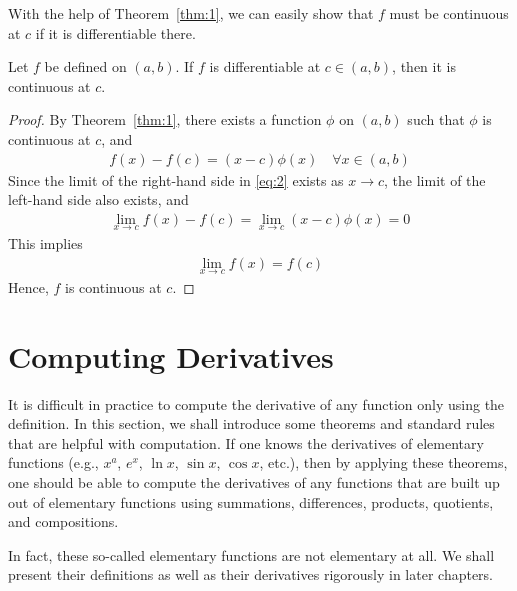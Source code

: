 \documentclass[thmcnt=section, 12pt]{my-elegantbook}
\begin{document}

With the help of Theorem~\ref{thm:1}, we can easily show that $f$ must be continuous at $c$ if it is differentiable there.

\begin{theorem} \label{thm:2}
    Let $f$ be defined on $(a, b)$. If $f$ is differentiable at $c \in (a, b)$, then it is continuous at $c$.
\end{theorem}

\begin{proof}
    By Theorem~\ref{thm:1}, there exists a function $\phi$ on $(a, b)$ such that $\phi$ is continuous at $c$, and
    \begin{align}
        f(x) - f(c) = (x - c) \phi(x)
        \quad \forall x \in (a, b)
        \label{eq:2}
    \end{align}
    Since the limit of the right-hand side in \eqref{eq:2} exists as $x \to c$, the limit of the left-hand side also exists, and
    \begin{align*}
        \lim_{x \to c} f(x) - f(c)
        = \lim_{x \to c}(x - c) \phi(x)
        = 0
    \end{align*}
    This implies
    \begin{align*}
        \lim_{x \to c} f(x) = f(c)
    \end{align*}
    Hence, $f$ is continuous at $c$.
\end{proof}


\section{Computing Derivatives}

It is difficult in practice to compute the derivative of any function only using the definition. In this section, we shall introduce some theorems and standard rules that are helpful with computation. If one knows the derivatives of elementary functions (e.g., $x^a$, $e^x$, $\ln x$, $\sin x$, $\cos x$, etc.), then by applying these theorems, one should be able to compute the derivatives of any functions that are built up out of elementary functions using summations, differences, products, quotients, and compositions.

\begin{note}
    In fact, these so-called elementary functions are not elementary at all. We shall present their definitions as well as their derivatives rigorously in later chapters.
\end{note}
\end{document}
